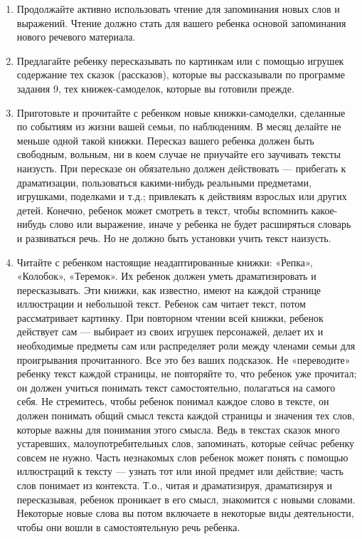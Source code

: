 \documentclass[a5paper]{book}
\begin{document}
\begin{enumerate}
\def\labelenumi{\arabic{enumi}.}
\setcounter{enumi}{1}
\item
  
  Продолжайте активно использовать чтение для запоминания новых слов и
  выражений. Чтение должно стать для вашего ребенка основой запоминания
  нового речевого материала.
  
\item
  
  Предлагайте ребенку пересказывать по картинкам или с помощью игрушек
  содержание тех сказок (рассказов), которые вы рассказывали по
  программе задания 9, тех книжек-самоделок, которые вы готовили прежде.
  
\item
  
  Приготовьте и прочитайте с ребенком новые книжки-самоделки, сделанные
  по событиям из жизни вашей семьи, по наблюдениям. В месяц делайте не
  меньше одной такой книжки. Пересказ вашего ребенка должен быть
  свободным, вольным, ни в коем случае не приучайте его заучивать тексты
  наизусть. При пересказе он обязательно должен действовать ---
  прибегать к драматизации, пользоваться какими-нибудь реальными
  предметами, игрушками, поделками и т.д.; привлекать к действиям
  взрослых или других детей. Конечно, ребенок может смотреть в текст,
  чтобы вспомнить какое-нибудь слово или выражение, иначе у ребенка не
  будет расширяться словарь и развиваться речь. Но не должно быть
  установки учить текст наизусть.
  
\item
  
  Читайте с ребенком настоящие неадаптированные книжки: «Репка»,
  «Колобок», «Теремок». Их ребенок должен уметь драматизировать и
  пересказывать. Эти книжки, как известно, имеют на каждой странице
  иллюстрации и небольшой текст. Ребенок сам читает текст, потом
  рассматривает картинку. При повторном чтении всей книжки, ребенок
  действует сам --- выбирает из своих игрушек персонажей, делает их и
  необходимые предметы сам или распределяет роли между членами семьи для
  проигрывания прочитанного. Все это без ваших подсказок. Не
  «переводите» ребенку текст каждой страницы, не повторяйте то, что
  ребенок уже прочитал; он должен учиться понимать текст самостоятельно,
  полагаться на самого себя. Не стремитесь, чтобы ребенок понимал каждое
  слово в тексте, он должен понимать общий смысл текста каждой страницы
  и значения тех слов, которые важны для понимания этого смысла. Ведь в
  текстах сказок много устаревших, малоупотребительных слов, запоминать,
  которые сейчас ребенку совсем не нужно. Часть незнакомых слов ребенок
  может понять с помощью иллюстраций к тексту --- узнать тот или иной
  предмет или действие; часть слов понимает из контекста. Т.о., читая и
  драматизируя, драматизируя и пересказывая, ребенок проникает в его
  смысл, знакомится с новыми словами. Некоторые новые слова вы потом
  включаете в некоторые виды деятельности, чтобы они вошли в
  самостоятельную речь ребенка.
  
\end{enumerate}
\end{document}
